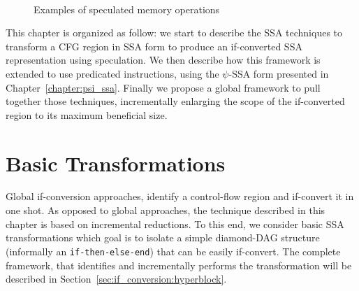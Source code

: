 \begin{figure}[h]
\hfill
{}\\
\hfill
{}
\caption{Examples of speculated memory operations}
\label{fig:spec}
\end{figure}




This chapter is organized as follow: we start to describe the SSA techniques to transform a CFG region in SSA form to produce an if-converted SSA representation using speculation. We then describe how this framework is extended to use predicated instructions, using the $\psi$-SSA form presented in Chapter~\ref{chapter:psi_ssa}. Finally we propose a global framework to pull together those techniques, incrementally enlarging the scope of the if-converted region to its maximum beneficial size.

\section{Basic Transformations}
\label{sec:basic}

Global if-conversion approaches, identify a control-flow region and if-convert it in one shot. As opposed to global approaches, the technique described in this chapter is based on incremental reductions. To this end, we consider basic SSA transformations which goal is to isolate a simple diamond-DAG structure (informally an \texttt{if-then-else-end}) that can be easily if-convert. The complete framework, that identifies and incrementally performs the transformation will be described in Section~\ref{sec:if_conversion:hyperblock}. 


